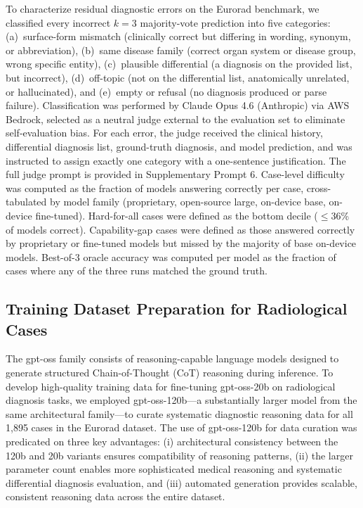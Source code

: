 \documentclass[10pt,journal,compsoc, onecolumn]{IEEEtran}
\begin{document}
To characterize residual diagnostic errors on the Eurorad benchmark, we classified every incorrect $k=3$ majority-vote prediction into five categories: (a)~surface-form mismatch (clinically correct but differing in wording, synonym, or abbreviation), (b)~same disease family (correct organ system or disease group, wrong specific entity), (c)~plausible differential (a diagnosis on the provided list, but incorrect), (d)~off-topic (not on the differential list, anatomically unrelated, or hallucinated), and (e)~empty or refusal (no diagnosis produced or parse failure). Classification was performed by Claude Opus 4.6 (Anthropic) via AWS Bedrock, selected as a neutral judge external to the evaluation set to eliminate self-evaluation bias. For each error, the judge received the clinical history, differential diagnosis list, ground-truth diagnosis, and model prediction, and was instructed to assign exactly one category with a one-sentence justification. The full judge prompt is provided in Supplementary Prompt 6. Case-level difficulty was computed as the fraction of models answering correctly per case, cross-tabulated by model family (proprietary, open-source large, on-device base, on-device fine-tuned). Hard-for-all cases were defined as the bottom decile ($\leq$36\% of models correct). Capability-gap cases were defined as those answered correctly by proprietary or fine-tuned models but missed by the majority of base on-device models. Best-of-3 oracle accuracy was computed per model as the fraction of cases where any of the three runs matched the ground truth.


\subsection*{Training Dataset Preparation for Radiological Cases}

The gpt-oss family consists of reasoning-capable language models designed to generate structured Chain-of-Thought (CoT) reasoning during inference. To develop high-quality training data for fine-tuning gpt-oss-20b on radiological diagnosis tasks, we employed gpt-oss-120b---a substantially larger model from the same architectural family---to curate systematic diagnostic reasoning data for all 1,895 cases in the Eurorad dataset. The use of gpt-oss-120b for data curation was predicated on three key advantages: (i) architectural consistency between the 120b and 20b variants ensures compatibility of reasoning patterns, (ii) the larger parameter count enables more sophisticated medical reasoning and systematic differential diagnosis evaluation, and (iii) automated generation provides scalable, consistent reasoning data across the entire dataset.
\end{document}
